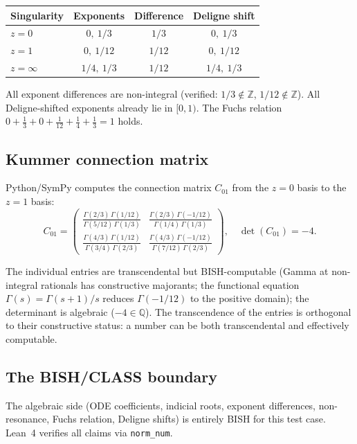 \documentclass[11pt,a4paper]{article}
\theoremstyle{plain}
\theoremstyle{definition}
\newcommand{\BISH}{\textsf{BISH}}
\newcommand{\Z}{\mathbb{Z}}
\newcommand{\Q}{\mathbb{Q}}
\begin{document}
\begin{center}
\begin{tabular}{lccc}
\toprule
Singularity & Exponents & Difference & Deligne shift \\
\midrule
$z = 0$ & $0,\ 1/3$ & $1/3$ & $0,\ 1/3$ \\
$z = 1$ & $0,\ 1/12$ & $1/12$ & $0,\ 1/12$ \\
$z = \infty$ & $1/4,\ 1/3$ & $1/12$ & $1/4,\ 1/3$ \\
\bottomrule
\end{tabular}
\end{center}

All exponent differences are non-integral (verified: $1/3 \notin \Z$, $1/12 \notin \Z$).
All Deligne-shifted exponents already lie in $[0,1)$.
The Fuchs relation $0 + \tfrac{1}{3} + 0 + \tfrac{1}{12} + \tfrac{1}{4} + \tfrac{1}{3} = 1$ holds.

\subsection{Kummer connection matrix}

Python/SymPy computes the connection matrix $C_{01}$ from the $z=0$ basis to the $z=1$ basis:
\[
C_{01} = \begin{pmatrix}
\frac{\Gamma(2/3)\,\Gamma(1/12)}{\Gamma(5/12)\,\Gamma(1/3)} & \frac{\Gamma(2/3)\,\Gamma(-1/12)}{\Gamma(1/4)\,\Gamma(1/3)} \\[6pt]
\frac{\Gamma(4/3)\,\Gamma(1/12)}{\Gamma(3/4)\,\Gamma(2/3)} & \frac{\Gamma(4/3)\,\Gamma(-1/12)}{\Gamma(7/12)\,\Gamma(2/3)}
\end{pmatrix},
\quad \det(C_{01}) = -4.
\]

The individual entries are transcendental but \BISH-computable (Gamma at non-integral rationals has constructive majorants; the functional equation $\Gamma(s) = \Gamma(s{+}1)/s$ reduces $\Gamma(-1/12)$ to the positive domain); the determinant is algebraic ($-4 \in \Q$).
The transcendence of the entries is orthogonal to their constructive status: a number can be both transcendental and effectively computable.

\subsection{The BISH/CLASS boundary}

The algebraic side (ODE coefficients, indicial roots, exponent differences, non-resonance, Fuchs relation, Deligne shifts) is entirely \BISH{} for this test case.
Lean~4 verifies all claims via \texttt{norm\_num}.
\end{document}
